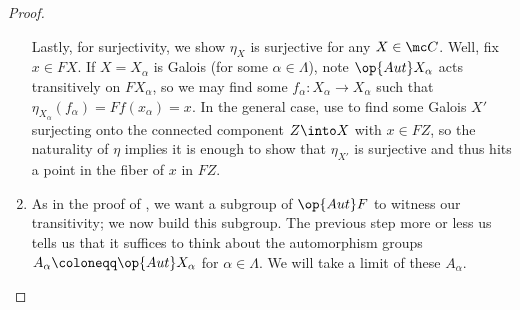 \documentclass{amsart}
\begin{document}
\begin{proof}
\begin{enumerate}
        Lastly, for surjectivity, we show $\eta_X$ is surjective for any $X\in\mc C$. Well, fix $x\in FX$. If $X=X_\alpha$ is Galois (for some $\alpha\in\Lambda$), note $\op{Aut}X_\alpha$ acts transitively on $FX_\alpha$, so we may find some $f_\alpha\colon X_\alpha\to X_\alpha$ such that $\eta_{X_\alpha}(f_\alpha)=Ff(x_\alpha)=x$. In the general case, use  to find some Galois $X'$ surjecting onto the connected component $Z\into X$ with $x\in FZ$, so the naturality of $\eta$ implies it is enough to show that $\eta_{X'}$ is surjective and thus hits a point in the fiber of $x$ in $FZ$.


        \item As in the proof of , we want a subgroup of $\op{Aut}F$ to witness our transitivity; we now build this subgroup. The previous step more or less us tells us that it suffices to think about the automorphism groups $A_\alpha\coloneqq\op{Aut}X_\alpha$ for $\alpha\in\Lambda$. We will take a limit of these $A_\alpha$.


\end{enumerate}
\end{proof}
\end{document}
